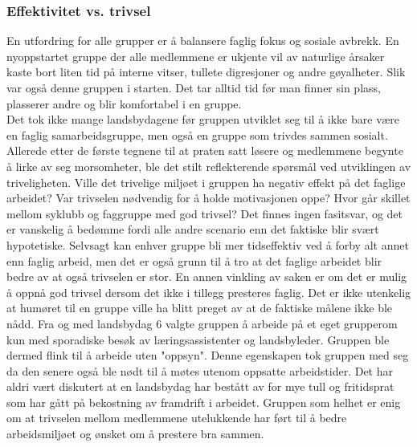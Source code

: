 \subsubsection{Effektivitet vs. trivsel}
En utfordring for alle grupper er å balansere faglig fokus og sosiale avbrekk.
En nyoppstartet gruppe der alle medlemmene er ukjente vil av naturlige årsaker kaste bort liten tid på interne vitser, tullete digresjoner og andre gøyalheter.
Slik var også denne gruppen i starten. Det tar alltid tid før man finner sin plass, plasserer andre og blir komfortabel i en gruppe.\\

Det tok ikke mange landsbydagene før gruppen utviklet seg til å ikke bare være en faglig samarbeidsgruppe, men også en gruppe som trivdes sammen sosialt. 
Allerede etter de første tegnene til at praten satt løsere og medlemmene begynte å lirke av seg morsomheter, ble det stilt reflekterende spørsmål ved utviklingen av triveligheten.
Ville det trivelige miljøet i gruppen ha negativ effekt på det faglige arbeidet?
Var trivselen nødvendig for å holde motivasjonen oppe? 
Hvor går skillet mellom syklubb og faggruppe med god trivsel?
Det finnes ingen fasitsvar, og det er vanskelig å bedømme fordi alle andre scenario enn det faktiske blir svært hypotetiske.
Selvsagt kan enhver gruppe bli mer tidseffektiv ved å forby alt annet enn faglig arbeid, men det er også grunn til å tro at det faglige arbeidet blir bedre av at også trivselen er stor.
En annen vinkling av saken er om det er mulig å oppnå god trivsel dersom det ikke i tillegg presteres faglig.
Det er ikke utenkelig at humøret til en gruppe ville ha blitt preget av at de faktiske målene ikke ble nådd.
Fra og med landsbydag 6 valgte gruppen å arbeide på et eget grupperom kun med sporadiske besøk av læringsassistenter og landsbyleder.
Gruppen ble dermed flink til å arbeide uten "oppsyn".
Denne egenskapen tok gruppen med seg da den senere også ble nødt til å møtes utenom oppsatte arbeidstider.
Det har aldri vært diskutert at en landsbydag har bestått av for mye tull og fritidsprat som har gått på bekostning av framdrift i arbeidet.
Gruppen som helhet er enig om at trivselen mellom medlemmene utelukkende har ført til å bedre arbeidsmiljøet og ønsket om å prestere bra sammen.